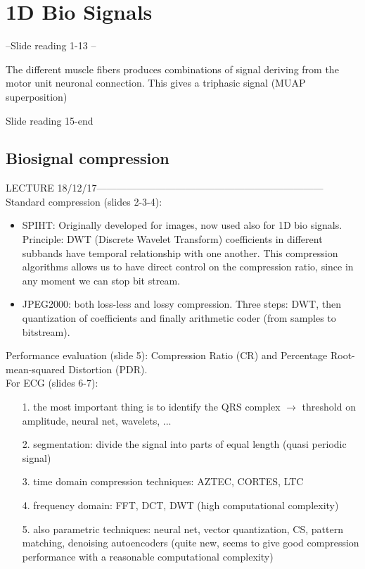 \chapter{1D Bio Signals}
--Slide reading 1-13 --

The different muscle fibers produces combinations of signal deriving from the motor unit neuronal connection. This gives a triphasic signal (MUAP superposition)

Slide reading 15-end

\section{Biosignal compression}
LECTURE 18/12/17---------------------------------------------------------------------\\
Standard compression (slides 2-3-4):
\begin{itemize}
  \item SPIHT: Originally developed for images, now used also for 1D bio signals. Principle: DWT (Discrete Wavelet Transform) coefficients in different subbands have temporal relationship with one another. This compression algorithms allows us to have direct control on the compression ratio, since in any moment we can stop bit stream.
  \item JPEG2000: both loss-less and lossy compression. Three steps: DWT, then quantization of coefficients and finally arithmetic coder (from samples to bitstream).
\end{itemize}
Performance evaluation (slide 5): Compression Ratio (CR) and Percentage Root-mean-squared Distortion (PDR).\\
For ECG (slides 6-7):
\begin{itemize}
  \item[1.] the most important thing is to identify the QRS complex $\rightarrow$ threshold on amplitude, neural net, wavelets, ...
  \item[2.] segmentation: divide the signal into parts of equal length (quasi periodic signal)
  \item[3.] time domain compression techniques: AZTEC, CORTES, LTC
  \item[4.] frequency domain: FFT, DCT, DWT (high computational complexity)
  \item[5.] also parametric techniques: neural net, vector quantization, CS, pattern matching, denoising autoencoders (quite new, seems to give good compression performance with a reasonable computational complexity)
\end{itemize}

